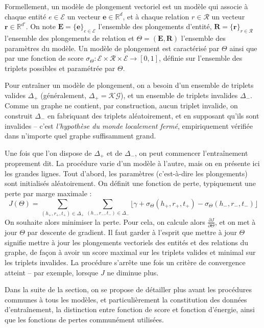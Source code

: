 Formellement, un modèle de plongement vectoriel est un modèle qui associe à chaque entité $e \in \mathcal{E}$ un vecteur $\mathbf{e} \in \mathbb{R}^d$, et à chaque relation $r \in \mathcal{R}$ un vecteur $\mathbf{r} \in \mathbb{R}^{d'}$. On note $\mathbf{E} = \{\mathbf{e}\}_{e \in \mathcal{E}} $ l'ensemble des plongements d'entité, $\mathbf{R} = \{\mathbf{r}\}_{r \in \mathcal{R}} $ l'ensemble des plongements de relation et $\Theta = (\mathbf{E}, \mathbf{R})$ l'ensemble des paramètres du modèle. Un modèle de plongement est caractérisé par $\Theta$ ainsi que par une fonction de score $\sigma_{\Theta} : \mathcal{E \times R \times E} \rightarrow [0, 1]$, définie sur l'ensemble des triplets possibles et paramétrée par $\Theta$.  

Pour entraîner un modèle de plongement, on a besoin d'un ensemble de triplets valides $\Delta_+$ (généralement, $\Delta_+ = \mathcal{KG}$), et un ensemble de triplets invalides $\Delta_-$. Comme un graphe ne contient, par construction, aucun triplet invalide, on construit $\Delta_-$ en fabriquant des triplets aléatoirement, et en supposant qu'ils sont invalides – c'est \textit{l'hypothèse du monde localement fermé}, empiriquement vérifiée dans n'importe quel graphe suffisamment grand.

Une fois que l'on dispose de $\Delta_+$ et de $\Delta_-$, on peut commencer l'entraînement proprement dit. La procédure varie d'un modèle à l'autre, mais on en présente ici les grandes lignes. Tout d'abord, les paramètres (c'est-à-dire les plongements) sont initialisés aléatoirement. On définit une fonction de perte, typiquement une perte par marge maximale :
$$
J(\Theta) = \sum_{(h_+, r_+, t_+) \in \Delta_+} \sum_{(h_-, r_-, t_-) \in \Delta_-} \lfloor \gamma + \sigma_\Theta(h_+, r_+, t_+) - \sigma_\Theta(h_-, r_-, t_-) \rfloor
$$
On souhaite alors minimiser la perte. Pour cela, on calcule alors $\displaystyle \frac{\partial J}{\partial \Theta}$, et on met à jour $\Theta$ par descente de gradient. Il faut garder à l'esprit que mettre à jour $\Theta$ signifie mettre à jour les plongements vectoriels des entités et des relations du graphe, de façon à avoir un score maximal sur les triplets valides et minimal sur les triplets invalides. La procédure s'arrête une fois un critère de convergence atteint – par exemple, lorsque $J$ ne diminue plus.

Dans la suite de la section, on se propose de détailler plus avant les procédures communes à tous les modèles, et particulièrement la constitution des données d'entraînement, la distinction entre fonction de score et fonction d'énergie, ainsi que les fonctions de pertes communément utilisées. 

